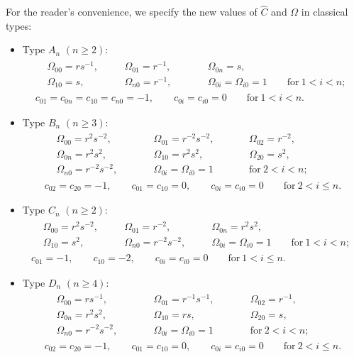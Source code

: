 \documentclass[pdftex]{sigma}
\numberwithin{equation}{section}
\begin{document}
\begin{Remark}
For the reader's convenience, we specify the new values of $\hat{C}$ and $\Omega$ in classical types:
\begin{itemize}\itemsep=0pt
\item Type $A_{n}$ $(n\geq 2)$:
\begin{gather*}
\begin{aligned}
 &\Omega_{00}=rs^{-1},\quad&& \Omega_{01}=r^{-1},\qquad&& \Omega_{0n}=s, \\
 &\Omega_{10}=s,\quad&& \Omega_{n0}=r^{-1}, \qquad&& \Omega_{0i}=\Omega_{i0}=1\qquad \text{for}\ 1<i<n;
 \end{aligned}
\\
c_{01}=c_{0n}=c_{10}=c_{n0}=-1,\qquad c_{0i}=c_{i0}=0 \qquad \text{for}\ 1<i<n.
\end{gather*}

\item Type $B_n$ $(n\geq 3)$:
\begin{gather*}
\begin{aligned}
 &\Omega_{00}=r^2s^{-2} ,\qquad&& \Omega_{01}=r^{-2}s^{-2} , \quad&& \Omega_{02}=r^{-2} , \\
 &\Omega_{0n}=r^2s^2 ,\qquad &&\Omega_{10}=r^2s^2 , \quad&& \Omega_{20}=s^2 ,\\
 & \Omega_{n0}=r^{-2}s^{-2} ,\qquad&& \Omega_{0i}=\Omega_{i0}=1 \qquad&& \text{for}\ 2<i<n;
 \end{aligned}
\\
 c_{02}=c_{20}=-1 , \qquad c_{01}=c_{10}=0 , \qquad c_{0i}=c_{i0}=0 \qquad\text{for}\ 2<i\leq n .
\end{gather*}

\item Type $C_n$ $(n\geq 2)$:
\begin{gather*}
\begin{aligned}
 &\Omega_{00}=r^2s^{-2}, \quad&& \Omega_{01}=r^{-2},\quad&& \Omega_{0n}=r^2s^2,\\
 & \Omega_{10}=s^2, \quad&& \Omega_{n0}=r^{-2}s^{-2} , \quad&& \Omega_{0i}=\Omega_{i0}=1 \qquad \text{for}\ 1<i<n ;
 \end{aligned}
\\
 c_{01}=-1,\qquad c_{10}=-2 , \qquad c_{0i}=c_{i0}=0 \qquad \text{for}\ 1<i\leq n .
\end{gather*}

\item Type $D_n$ $(n\geq 4)$:
\begin{gather*}
\begin{aligned}
 &\Omega_{00}=rs^{-1},\qquad&& \Omega_{01}=r^{-1}s^{-1},\qquad&& \Omega_{02}=r^{-1},\\
 &\Omega_{0n}=r^2s^2, \qquad&& \Omega_{10}=rs,\qquad&& \Omega_{20}=s,\\
 &\Omega_{n0}=r^{-2}s^{-2} , \qquad&& \Omega_{0i}=\Omega_{i0}=1 \qquad&& \text{for}\ 2<i<n ;
 \end{aligned}
\\
 c_{02}=c_{20}=-1 ,\qquad c_{01}=c_{10}=0 , \qquad c_{0i}=c_{i0}=0 \qquad \text{for}\ 2<i\leq n .
\end{gather*}
\end{itemize}
\end{Remark}
\end{document}
